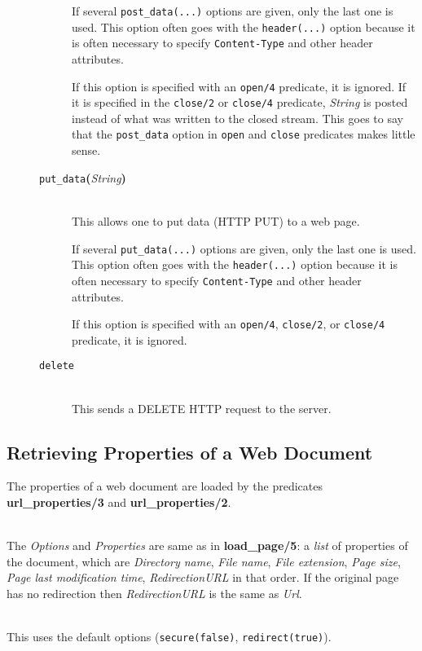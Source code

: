 \begin{description}
\begin{description}
    If several \texttt{post\_data(...)} options are given, only the last one is
    used. This option often goes with the \texttt{header(...)} option because it
    is often necessary to specify \texttt{Content-Type} and other header
    attributes.  

    If this option is specified with an \texttt{open/4} predicate, it is
    ignored.  If it is specified in the \texttt{close/2} or 
    \texttt{close/4}   predicate, \emph{String} is posted instead of what was
    written to the closed stream. This goes to say that the \texttt{post\_data}
    option in \texttt{open} and \texttt{close} predicates makes little sense. 
    \item[{\tt put\_data}{\bf (}{\it String}{\bf )}]\mbox{}\\
    This allows one to put data (HTTP PUT) to a web page.

    If several \texttt{put\_data(...)} options are given, only the last one is
    used. This option often goes with the \texttt{header(...)} option because it
    is often necessary to specify \texttt{Content-Type} and other header
    attributes.  

    If this option is specified with an \texttt{open/4},
    \texttt{close/2}, or \texttt{close/4} predicate, it is
    ignored.
  \item[\tt delete] \mbox{} \\
    This sends a DELETE HTTP request to the server.
  \end{description}

\end{description}

\subsection{Retrieving Properties of a Web Document}

The properties of a web document are loaded by the predicates {\bf
  url\_properties/3} and {\bf url\_properties/2}. 

\begin{description}
\item[url\_properties({\it +Url, +Options, -Properties})]\mbox{}
  \\
  The {\it Options} and {\it Properties} are same as in {\bf load\_page/5}:
  a \emph{list} of properties of the document, which
  are {\it Directory name}, {\it File name}, {\it File extension}, {\it
    Page size}, {\it Page last modification time}, \emph{RedirectionURL} 
  in that order. If the original page has no redirection then
  \emph{RedirectionURL} is the same as \emph{Url}. 
\item[url\_properties({\it +Url, -Properties})]\mbox{}
  \\
  This uses the default options (\texttt{secure(false)}, \texttt{redirect(true)}). 

\end{description}


